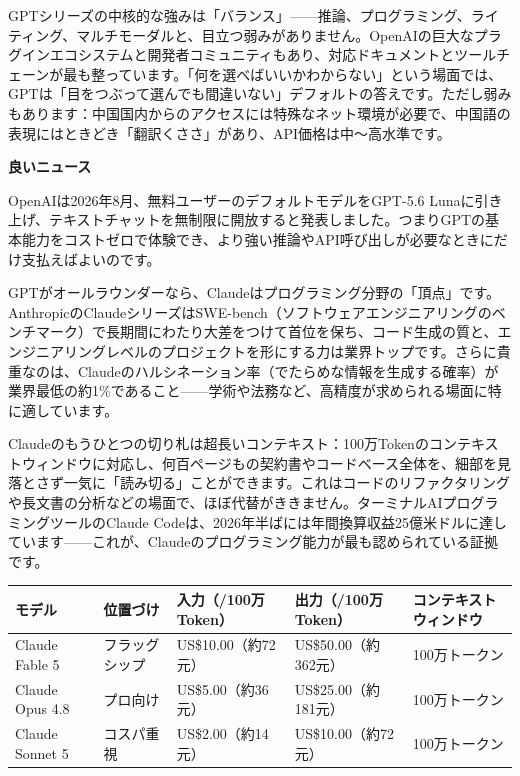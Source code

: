 GPTシリーズの中核的な強みは「バランス」——推論、プログラミング、ライティング、マルチモーダルと、目立つ弱みがありません。OpenAIの巨大なプラグインエコシステムと開発者コミュニティもあり、対応ドキュメントとツールチェーンが最も整っています。「何を選べばいいかわからない」という場面では、GPTは「目をつぶって選んでも間違いない」デフォルトの答えです。ただし弱みもあります：中国国内からのアクセスには特殊なネット環境が必要で、中国語の表現にはときどき「翻訳くささ」があり、API価格は中〜高水準です。

\textbf{良いニュース}\par

OpenAIは2026年8月、無料ユーザーのデフォルトモデルをGPT-5.6 Lunaに引き上げ、テキストチャットを無制限に開放すると発表しました。つまりGPTの基本能力をコストゼロで体験でき、より強い推論やAPI呼び出しが必要なときにだけ支払えばよいのです。


GPTがオールラウンダーなら、Claudeはプログラミング分野の「頂点」です。AnthropicのClaudeシリーズはSWE-bench（ソフトウェアエンジニアリングのベンチマーク）で長期間にわたり大差をつけて首位を保ち、コード生成の質と、エンジニアリングレベルのプロジェクトを形にする力は業界トップです。さらに貴重なのは、Claudeのハルシネーション率（でたらめな情報を生成する確率）が業界最低の約1\%であること——学術や法務など、高精度が求められる場面に特に適しています。

Claudeのもうひとつの切り札は超長いコンテキスト：100万Tokenのコンテキストウィンドウに対応し、何百ページもの契約書やコードベース全体を、細部を見落とさず一気に「読み切る」ことができます。これはコードのリファクタリングや長文書の分析などの場面で、ほぼ代替がききません。ターミナルAIプログラミングツールのClaude Codeは、2026年半ばには年間換算収益25億米ドルに達しています——これが、Claudeのプログラミング能力が最も認められている証拠です。

\begin{center}
\begin{tabularx}{\linewidth}{|X|X|X|X|X|}
\hline
\textbf{モデル} & \textbf{位置づけ} & \textbf{入力（/100万Token）} & \textbf{出力（/100万Token）} & \textbf{コンテキストウィンドウ} \tabularnewline
\hline
Claude Fable 5 & フラッグシップ & US\$10.00（約72元） & US\$50.00（約362元） & 100万トークン \tabularnewline
Claude Opus 4.8 & プロ向け & US\$5.00（約36元） & US\$25.00（約181元） & 100万トークン \tabularnewline
Claude Sonnet 5 & コスパ重視 & US\$2.00（約14元） & US\$10.00（約72元） & 100万トークン \tabularnewline
\hline
\end{tabularx}
\end{center}

